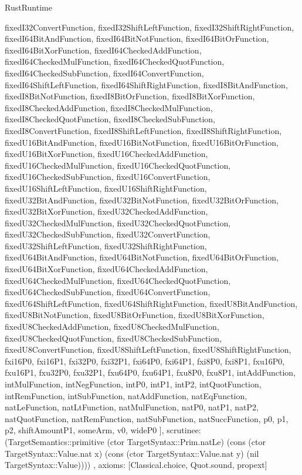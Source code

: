 \begin{lexlean}{RustRuntime}
\begin{semanticmodule}
{{      fixedI32ConvertFunction,
      fixedI32ShiftLeftFunction,
      fixedI32ShiftRightFunction,
      fixedI64BitAndFunction,
      fixedI64BitNotFunction,
      fixedI64BitOrFunction,
      fixedI64BitXorFunction,
      fixedI64CheckedAddFunction,
      fixedI64CheckedMulFunction,
      fixedI64CheckedQuotFunction,
      fixedI64CheckedSubFunction,
      fixedI64ConvertFunction,
      fixedI64ShiftLeftFunction,
      fixedI64ShiftRightFunction,
      fixedI8BitAndFunction,
      fixedI8BitNotFunction,
      fixedI8BitOrFunction,
      fixedI8BitXorFunction,
      fixedI8CheckedAddFunction,
      fixedI8CheckedMulFunction,
      fixedI8CheckedQuotFunction,
      fixedI8CheckedSubFunction,
      fixedI8ConvertFunction,
      fixedI8ShiftLeftFunction,
      fixedI8ShiftRightFunction,
      fixedU16BitAndFunction,
      fixedU16BitNotFunction,
      fixedU16BitOrFunction,
      fixedU16BitXorFunction,
      fixedU16CheckedAddFunction,
      fixedU16CheckedMulFunction,
      fixedU16CheckedQuotFunction,
      fixedU16CheckedSubFunction,
      fixedU16ConvertFunction,
      fixedU16ShiftLeftFunction,
      fixedU16ShiftRightFunction,
      fixedU32BitAndFunction,
      fixedU32BitNotFunction,
      fixedU32BitOrFunction,
      fixedU32BitXorFunction,
      fixedU32CheckedAddFunction,
      fixedU32CheckedMulFunction,
      fixedU32CheckedQuotFunction,
      fixedU32CheckedSubFunction,
      fixedU32ConvertFunction,
      fixedU32ShiftLeftFunction,
      fixedU32ShiftRightFunction,
      fixedU64BitAndFunction,
      fixedU64BitNotFunction,
      fixedU64BitOrFunction,
      fixedU64BitXorFunction,
      fixedU64CheckedAddFunction,
      fixedU64CheckedMulFunction,
      fixedU64CheckedQuotFunction,
      fixedU64CheckedSubFunction,
      fixedU64ConvertFunction,
      fixedU64ShiftLeftFunction,
      fixedU64ShiftRightFunction,
      fixedU8BitAndFunction,
      fixedU8BitNotFunction,
      fixedU8BitOrFunction,
      fixedU8BitXorFunction,
      fixedU8CheckedAddFunction,
      fixedU8CheckedMulFunction,
      fixedU8CheckedQuotFunction,
      fixedU8CheckedSubFunction,
      fixedU8ConvertFunction,
      fixedU8ShiftLeftFunction,
      fixedU8ShiftRightFunction,
      fxi16P0,
      fxi16P1,
      fxi32P0,
      fxi32P1,
      fxi64P0,
      fxi64P1,
      fxi8P0,
      fxi8P1,
      fxu16P0,
      fxu16P1,
      fxu32P0,
      fxu32P1,
      fxu64P0,
      fxu64P1,
      fxu8P0,
      fxu8P1,
      intAddFunction,
      intMulFunction,
      intNegFunction,
      intP0,
      intP1,
      intP2,
      intQuotFunction,
      intRemFunction,
      intSubFunction,
      natAddFunction,
      natEqFunction,
      natLeFunction,
      natLtFunction,
      natMulFunction,
      natP0,
      natP1,
      natP2,
      natQuotFunction,
      natRemFunction,
      natSubFunction,
      natSuccFunction,
      p0,
      p1,
      p2,
      shiftAmountP1,
      someArm,
      v0,
      wideP0
    ],
    scrutinee: (TargetSemantics::primitive (ctor TargetSyntax::Prim.natLe) (cons (ctor TargetSyntax::Value.nat x) (cons (ctor TargetSyntax::Value.nat y) (nil TargetSyntax::Value))))
  },
  axioms: [Classical.choice, Quot.sound, propext]
}


\end{semanticmodule}
\end{lexlean}
